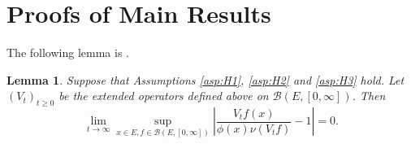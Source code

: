 \documentclass[12pt,a4paper]{amsart}
\numberwithin{equation}{section}
\theoremstyle{plain}
\newtheorem{lem}[thm]{Lemma}
\theoremstyle{definition}
\theoremstyle{remark}
\begin{document}
\section{Proofs of Main Results}
\begin{comment}
\subsection{Proof of Theorem \ref{thm:Q}}

First note that the operators $(V_t)_{t\geq 0}$
given by \eqref{eq:M.1} can be extended uniquely to  $\mathcal B(E,[0,\infty])$ such that
\begin{equation}
\begin{minipage}{0.8\textwidth}
	$\mathbb P_\mu [e^{-X_t(f)}] = e^{- \mu(V_tf)}$ for $t\geq 0$, $\mu \in \mathcal M_f(E)$, and $f\in \mathcal B(E,[0,\infty])$.
\end{minipage} \label{eq:BGD.2}
\end{equation}
Define $v(t,x) = V_t(\infty  \mathbf 1_E)(x)=\lim_{\theta \to \infty} V_t(\theta \mathbf 1_E)(x)$ for $t\geq 0, x\in E$, then it holds that
\begin{equation} \label{eq: v and extinction}
	\mathbb P_\mu(\tau_0 \leq t)=\mathbb P_\mu (\|X_t\| = 0)
	= e^{- \mu (v_t)},
	\quad \mu \in \mathcal M_f(E), t\geq 0.
\end{equation}

We now give some basic properties of $V_tf$. Put
\[
\psi_0(x,z)=\psi(x,z)+\beta(x)z,
\quad x\in E, z>0.
\]
For any $f\in\mathcal B(E,[0,\infty])$ and any $t\geq 0$, \eqref{eq:M.1} can be rewritten as
\begin{equation} \label{eq:BGD.3}
	V_{t+s}f(x) + \Big[\int_0^{s}P^{\beta}_{s-u} \psi_0(\cdot, V_{t+u} f(\cdot))(x) {\mathrm d}s\Big] = P^\beta_sV_tf(x) \quad s\geq 0, x\in E.
\end{equation}
Integrating both sides of \eqref{eq:BGD.3} with respect to $\nu$, we obtain
\begin{equation}\label{eq:BGD.4}
\langle V_{t+s}f, \nu\rangle + \Big[\int_0^{s}e^{\lambda(s-u)}\langle \psi_0(\cdot, V_{t+u} f(\cdot)),\nu\rangle {\mathrm d}s\Big] =e^{\lambda s}\langle V_tf,\nu\rangle.
\end{equation}
\end{comment}
The following lemma is \cite[Proposition 1.4]{LiuRenSongSun2020}.
\begin{lem}\label{lem:rate}
	Suppose that Assumptions \eqref{asp:H1}, \eqref{asp:H2} and \eqref{asp:H3} hold. 
Let $(V_t)_{t\ge0}$ be the extended operators defined above on  $\mathcal B(E,[0,\infty])$.
Then
\[
\lim_{t\to\infty}\sup_{x\in E, f\in \mathcal B(E,[0,\infty]) }\left|\dfrac{V_tf(x)}{\phi(x)\nu(V_tf)}-1\right|=0.
\]
\end{lem}
\begin{comment}

The results in the following two lemmas are actually proved in \cite{LiuRenSongSun2020}, but not stated as  separate results. For the reader's convenience, we state theses results as two lemmas and give outlines of their proofs.
\end{comment}
\end{document}
